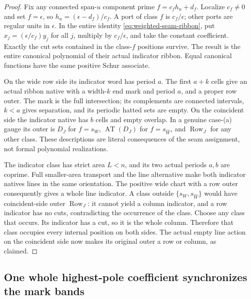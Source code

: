 \documentclass[11pt,a4paper]{amsart}
\numberwithin{equation}{section}
\theoremstyle{plain}
\theoremstyle{definition}
\newcommand{\AT}{\operatorname{AT}}
\newcommand{\Row}{\operatorname{Row}}
\begin{document}
\begin{proof}
Fix any connected span-\(u\) component prime
\(f=c_fh_u+d_f\).  Localize \(c_f\ne0\) and set \(f=\epsilon\), so
\(h_u=(\epsilon-d_f)/c_f\).  A port of class \(f\) is \(c_f/\epsilon\);
other ports are regular units in \(\epsilon\).
In the entire identity \eqref{eq:weighted-seam-ribbon}, put
\(x_j=(\epsilon/c_f)y_j\) for all \(j\), multiply by \(c_f/\epsilon\), and take
the constant coefficient.  Exactly the cut sets contained in the
class-\(f\) positions survive.  The result is the entire canonical
polynomial of their actual indicator ribbon.  Equal canonical functions
have the same positive Schur associate.

On the wide row side its indicator word has period \(a\).  The first
\(a+k\) cells give an actual ribbon native with a width-\(k\) end mark and
period \(a\), and a proper row outer.  The mark is the full intersection;
its complements are connected intervals, \(k<a\) gives separation, and
its periodic hatted sets are empty.  On the coincident side the indicator
native has \(b\) cells and empty overlap.  In a genuine case-(a) gauge its
outer is \(D_J\) for \(f=s_W\), \(\AT(D_J)\) for \(f=s_{\widehat W}\), and
\(\Row_J\) for any other class.  These descriptions are literal consequences
of the seam assignment, not formal polynomial realizations.

The indicator class has strict area \(L<n\), and its two actual periods
\(a,b\) are coprime.  Full smaller-area transport and the line alternative
make both indicator natives lines in the same orientation.  The positive
wide chart with a row outer consequently gives a whole line indicator.
A class outside \(\{s_W,s_{\widehat W}\}\) would have coincident-side outer
\(\Row_J\): it cannot yield a column indicator, and a row indicator has no
cuts, contradicting the occurrence of the class.  Choose any class that
occurs.  Its indicator has a cut, so it is the whole column.  Therefore
that class occupies every internal position on both sides.  The actual
empty line action on the coincident side now makes its original outer
a row or column, as claimed.
\end{proof}

\subsection{One whole highest-pole coefficient synchronizes the mark bands}
\end{document}
